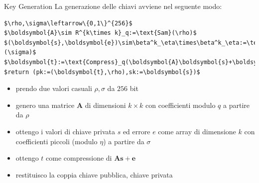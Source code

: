 \begin{frame}[fragile]{Key Generation}
    La generazione delle chiavi avviene nel seguente modo:

    \vspace{\baselineskip}

    \begin{minipage}{0.35\linewidth}
        \begin{lstlisting}[title=Kyber.CPA.KeyGen():,mathescape=true]
$\rho,\sigma\leftarrow\{0,1\}^{256}$
$\boldsymbol{A}\sim R^{k\times k}_q:=\text{Sam}(\rho)$
$(\boldsymbol{s},\boldsymbol{e})\sim\beta^k_\eta\times\beta^k_\eta:=\text{Sam}(\sigma)$
$\boldsymbol{t}:=\text{Compress}_q(\boldsymbol{A}\boldsymbol{s}+\boldsymbol{e},d_t)$
$return (pk:=(\boldsymbol{t},\rho),sk:=\boldsymbol{s})$
        \end{lstlisting}
    \end{minipage}\hfill
    \begin{minipage}{0.6\linewidth}
        \begin{itemize}%
            \item prendo due valori casuali $\rho,\sigma$ da $256$ bit
            \item genero una matrice $\boldsymbol{A}$ di dimensioni $k\times k$ con coefficienti modulo $q$ a partire da $\rho$
            \item ottengo i valori di chiave privata $s$ ed errore $e$ come array di dimensione $k$ con coefficienti piccoli (modulo $\eta$) a partire da $\sigma$
            \item ottengo $t$ come compressione di $\boldsymbol{A}\boldsymbol{s}+\boldsymbol{e}$
            \item restituisco la coppia chiave pubblica, chiave privata
        \end{itemize}
    \end{minipage}

\end{frame}

